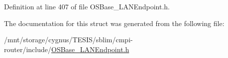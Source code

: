 Definition at line 407 of file OSBase\_\-LANEndpoint.h.

The documentation for this struct was generated from the following file:\begin{DoxyCompactItemize}
\item 
/mnt/storage/cygnus/TESIS/sblim/cmpi-\/router/include/\hyperlink{_o_s_base___l_a_n_endpoint_8h}{OSBase\_\-LANEndpoint.h}\end{DoxyCompactItemize}

